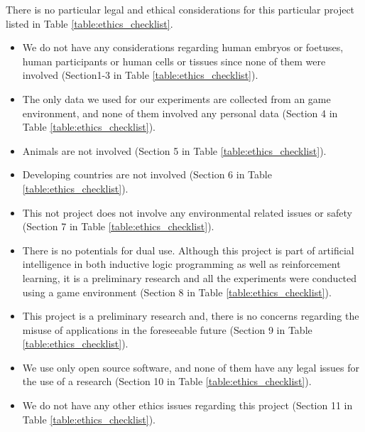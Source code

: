 There is no particular legal and ethical considerations for this particular project listed in Table \ref{table:ethics_checklist}.
\begin{itemize}
    \item We do not have any considerations regarding human embryos or foetuses, human participants or human cells or tissues since none of them were involved (Section1-3 in Table \ref{table:ethics_checklist}). \item The only data we used for our experiments are collected from an game environment, and none of them involved any personal data (Section 4 in Table \ref{table:ethics_checklist}). 
    \item Animals are not involved (Section 5 in Table \ref{table:ethics_checklist}).
    \item Developing countries are not involved (Section 6 in Table \ref{table:ethics_checklist}).
    \item This not project does not involve any environmental related issues or safety (Section 7 in Table \ref{table:ethics_checklist}).
    \item There is no potentials for dual use. Although this project is part of artificial intelligence in both inductive logic programming as well as reinforcement learning, it is a preliminary research and all the experiments were conducted using a game environment (Section 8 in Table \ref{table:ethics_checklist}).
    \item This project is a preliminary research and, there is no concerns regarding the misuse of applications in the foreseeable future (Section 9 in Table \ref{table:ethics_checklist}).
    \item We use only open source software, and none of them have any legal issues for the use of a research (Section 10 in Table \ref{table:ethics_checklist}).
    \item We do not have any other ethics issues regarding this project (Section 11 in Table \ref{table:ethics_checklist}).
\end{itemize}


